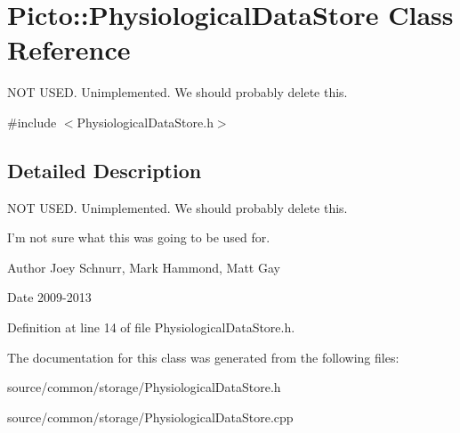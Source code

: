 \hypertarget{class_picto_1_1_physiological_data_store}{\section{Picto\-:\-:Physiological\-Data\-Store Class Reference}
\label{class_picto_1_1_physiological_data_store}
}


N\-O\-T U\-S\-E\-D. Unimplemented. We should probably delete this.  




{\ttfamily \#include $<$Physiological\-Data\-Store.\-h$>$}



\subsection{Detailed Description}
N\-O\-T U\-S\-E\-D. Unimplemented. We should probably delete this. 

I'm not sure what this was going to be used for. \begin{DoxyAuthor}{Author}
Joey Schnurr, Mark Hammond, Matt Gay 
\end{DoxyAuthor}
\begin{DoxyDate}{Date}
2009-\/2013 
\end{DoxyDate}


Definition at line 14 of file Physiological\-Data\-Store.\-h.



The documentation for this class was generated from the following files\-:\begin{DoxyCompactItemize}
\item 
source/common/storage/Physiological\-Data\-Store.\-h\item 
source/common/storage/Physiological\-Data\-Store.\-cpp\end{DoxyCompactItemize}
